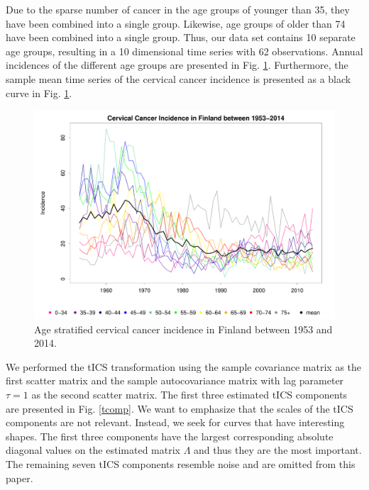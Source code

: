 \documentclass{llncs}
\begin{document}
Due to the sparse number of cancer in the age groups of younger than 35, they have been combined  into a single group. Likewise, age groups of older than 74 have been combined into a single group. Thus, our data set contains 10 separate age groups, resulting in a 10 dimensional time series with 62 observations. Annual incidences of the different age groups  are  presented in Fig. \ref{p1b}. Furthermore, the sample mean time series of the cervical cancer incidence is presented as a black curve in Fig. \ref{p1b}.
\begin{figure}
   \centering
\includegraphics[width=1\linewidth]{cervicaloriginal.pdf}
\caption{Age stratified cervical cancer incidence in Finland between 1953 and 2014.}
\label{p1b}
\end{figure}

We performed the tICS transformation using the sample covariance matrix as the first scatter matrix and the sample autocovariance matrix with lag parameter $\tau=1$ as the second scatter matrix. 
The first three estimated tICS components are presented in Fig. \ref{tcomp}. We want to emphasize that the scales of the tICS components are not relevant. Instead, we seek for curves that have interesting shapes. The first three components have the largest corresponding absolute diagonal values on the estimated matrix $\Lambda$ and thus they are the most important. The remaining seven tICS components resemble noise and are omitted from this paper.

 
\end{document}
